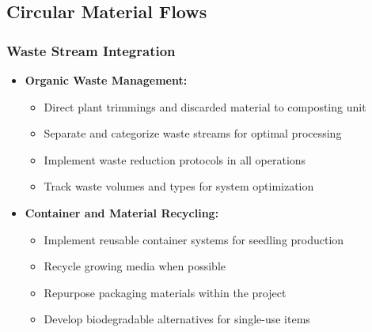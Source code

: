\subsection{Circular Material Flows}

\subsubsection{Waste Stream Integration}
\begin{itemize}
    \item \textbf{Organic Waste Management:}
    \begin{itemize}
        \item Direct plant trimmings and discarded material to composting unit
        \item Separate and categorize waste streams for optimal processing
        \item Implement waste reduction protocols in all operations
        \item Track waste volumes and types for system optimization
    \end{itemize}
    
    \item \textbf{Container and Material Recycling:}
    \begin{itemize}
        \item Implement reusable container systems for seedling production
        \item Recycle growing media when possible
        \item Repurpose packaging materials within the project
        \item Develop biodegradable alternatives for single-use items
    \end{itemize}
\end{itemize}

